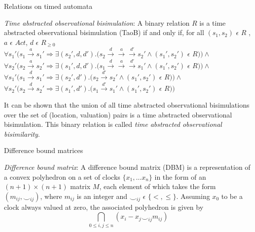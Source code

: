 \documentclass{beamer}
\begin{document}
\begin{frame}{Relations on timed automata}
\begin{definition} \label{def:taob} \emph{Time abstracted observational bisimulation}: A binary relation
  $R$ is a time abstracted observational bisimulation (TaoB) if and only if, for all
  $(s_1, s_2)$ $\epsilon$ $R$ , $a$ $\epsilon$ $Act $, $d$ $\epsilon$ $R_{\ge 0}$\\
  $\forall s_1' (s_1 \xrightarrow{a} s_1' \Rightarrow \exists (s_2',
  d, d') . (s_2 \xrightarrow{d} \xrightarrow{a} \xrightarrow{d'} s_2'
  \wedge (s_1', s_2')$ $\epsilon$ $R ) ) \wedge $ \\
  $\forall s_2' (s_2 \xrightarrow{a} s_2' \Rightarrow \exists (s_1',
  d, d') . (s_1 \xrightarrow{d} \xrightarrow{a} \xrightarrow{d'} s_1'
  \wedge (s_1', s_2')$ $\epsilon$ $R ) ) \wedge $ \\
  $\forall s_1' (s_1 \xrightarrow{d} s_1' \Rightarrow \exists (s_2',
  d')
  . (s_2 \xrightarrow{d'} s_2' \wedge (s_1', s_2')$ $\epsilon$ $R ) )
  \wedge $ \\
  $\forall s_2' (s_2 \xrightarrow{d} s_2' \Rightarrow \exists (s_1', d')
  . (s_1 \xrightarrow{d'} s_1' \wedge (s_1', s_2')$ $\epsilon$ $R ) ) $ \\
\end{definition}

It can be shown that
  the union of all time abstracted observational bisimulations over the
  set of (location, valuation) pairs is a time abstracted observational
  bisimulation. This binary relation is called \textit{time abstracted
    observational bisimilarity}.

\end{frame}

\begin{frame}{Difference bound matrices}
\begin{definition}
  \emph{Difference bound matrix}: A difference bound matrix (DBM) is a
  representation of a convex polyhedron on a set of clocks $\{x_{1},
  \ldots x_{n}\}$ in the form of an $(n+1) \times (n+1)$
  matrix $M$, each element of which takes the form $(m_{ij}, \smile
  _{ij})$, where $m_{ij}$ is an integer and $\smile_{ij}$ $\epsilon$
  $\{ <, \leq\}$. Assuming $x_0$ to be a clock always valued at zero,
  the associated polyhedron is given by
  \begin{displaymath}
    \bigcap_{0 \leq i, j \leq n}(x_{i} - x_{j} \smile_{ij} m_{ij})
  \end{displaymath}
\end{definition}
\end{frame}
\end{document}
